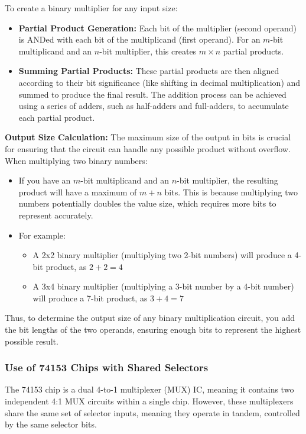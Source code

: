 \documentclass[12pt]{article}
\begin{document}
To create a binary multiplier for any input size:
\begin{itemize}
	\item \textbf{Partial Product Generation:} Each bit of the multiplier (second operand) is ANDed with each bit of the multiplicand (first operand). For an \( m \)-bit multiplicand and an \( n \)-bit multiplier, this creates \( m \times n \) partial products.
	\item \textbf{Summing Partial Products:} These partial products are then aligned according to their bit significance (like shifting in decimal multiplication) and summed to produce the final result. The addition process can be achieved using a series of adders, such as half-adders and full-adders, to accumulate each partial product.
\end{itemize}
\textbf{Output Size Calculation:}
The maximum size of the output in bits is crucial for ensuring that the circuit can handle any possible product without overflow. When multiplying two binary numbers:
\begin{itemize}
	\item If you have an \( m \)-bit multiplicand and an \( n \)-bit multiplier, the resulting product will have a maximum of \( m + n \) bits. This is because multiplying two numbers potentially doubles the value size, which requires more bits to represent accurately.
	\item For example:
	      \begin{itemize}
		      \item A 2x2 binary multiplier (multiplying two 2-bit numbers) will produce a 4-bit product, as \( 2 + 2 = 4 \)
		      \item A 3x4 binary multiplier (multiplying a 3-bit number by a 4-bit number) will produce a 7-bit product, as \( 3 + 4 = 7 \)
	      \end{itemize}
\end{itemize}

Thus, to determine the output size of any binary multiplication circuit, you add the bit lengths of the two operands, ensuring enough bits to represent the highest possible result.

\subsubsection*{Use of 74153 Chips with Shared Selectors}

The 74153 chip is a dual 4-to-1 multiplexer (MUX) IC, meaning it contains two independent 4:1 MUX circuits within a single chip. However, these multiplexers share the same set of selector inputs, meaning they operate in tandem, controlled by the same selector bits.
\end{document}
